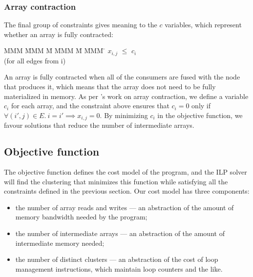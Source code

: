 


\subsubsection{Array contraction}
The final group of constraints gives meaning to the $c$ variables, which represent whether an array is fully contracted:
\begin{tabbing}
MMM     \= MMM \= M \= MMM \= M \= MMM \= \kill
        \> $x_{i,j}$    \> $\le$ \> $c_i$  \> \> \\
        \> (for all edges from i)
\end{tabbing}

An array is fully contracted when all of the consumers are fused with the node that produces it, which means that the array does not need to be fully materialized in memory.
As per \citet{darte2002contraction}'s work on array contraction, we define a variable $c_i$ for each array, and the constraint above ensures that $c_i = 0$ only if $\forall (i',j) \in E.\ i = i' \implies x_{i,j} = 0$.
By minimizing $c_i$ in the objective function, we favour solutions that reduce the number of intermediate arrays.


\subsection{Objective function}
\label{clustering:s:ObjectiveFunction}
The objective function defines the cost model of the program, and the ILP solver will find the clustering that minimizes this function while satisfying all the constraints defined in the previous section.
Our cost model has three components:
\begin{itemize}
\item
the number of array reads and writes --- an abstraction of the amount of memory bandwidth needed by the program; 
\item
the number of intermediate arrays --- an abstraction of the amount of intermediate memory needed; 
\item
the number of distinct clusters --- an abstraction of the cost of loop management instructions, which maintain loop counters and the like.
\end{itemize}


